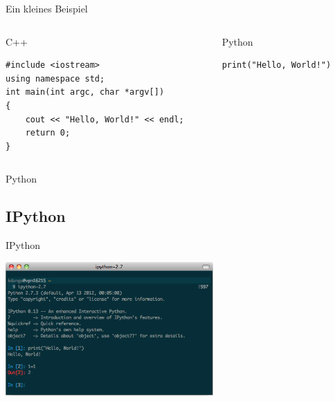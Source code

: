 \begin{frame}[fragile]{Ein kleines Beispiel}
  \vspace{-1em}
  \begin{columns}
    \begin{column}{0.5\textwidth}
      \begin{exampleblock}{C++}
        \begin{verbatim}
#include <iostream>
using namespace std;
int main(int argc, char *argv[])
{
    cout << "Hello, World!" << endl;
    return 0;
}
        \end{verbatim}
      \end{exampleblock}
    \end{column}
    \begin{column}{0.5\textwidth}
      \begin{exampleblock}{Python}
        \begin{verbatim}
print("Hello, World!")
        \end{verbatim}
      \end{exampleblock}
    \end{column}
  \end{columns}
\end{frame}

\begin{frame}{Python}
  \tableofcontents[sectionstyle=show/hide,
                   subsectionstyle=show/show/hide,
                   subsubsectionstyle=show/show/show]
\end{frame}

\subsection{IPython}
\begin{frame}{IPython}
  \begin{center}
    \includegraphics[width=300px]{img/ipython.png}
  \end{center}
\end{frame}

